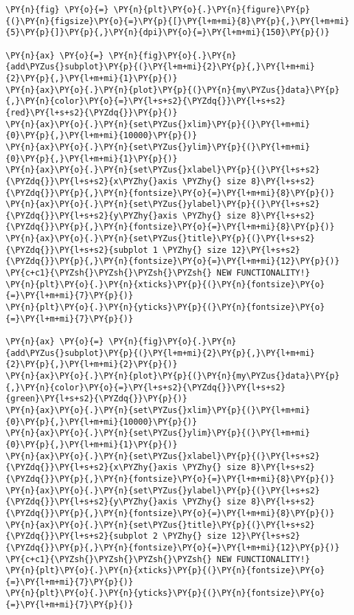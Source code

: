     \begin{tcolorbox}[breakable, size=fbox, boxrule=1pt, pad at break*=1mm,colback=cellbackground, colframe=cellborder]
\begin{Verbatim}[commandchars=\\\{\}]
\PY{n}{fig} \PY{o}{=} \PY{n}{plt}\PY{o}{.}\PY{n}{figure}\PY{p}{(}\PY{n}{figsize}\PY{o}{=}\PY{p}{[}\PY{l+m+mi}{8}\PY{p}{,}\PY{l+m+mi}{5}\PY{p}{]}\PY{p}{,}\PY{n}{dpi}\PY{o}{=}\PY{l+m+mi}{150}\PY{p}{)} 

\PY{n}{ax} \PY{o}{=} \PY{n}{fig}\PY{o}{.}\PY{n}{add\PYZus{}subplot}\PY{p}{(}\PY{l+m+mi}{2}\PY{p}{,}\PY{l+m+mi}{2}\PY{p}{,}\PY{l+m+mi}{1}\PY{p}{)}
\PY{n}{ax}\PY{o}{.}\PY{n}{plot}\PY{p}{(}\PY{n}{my\PYZus{}data}\PY{p}{,}\PY{n}{color}\PY{o}{=}\PY{l+s+s2}{\PYZdq{}}\PY{l+s+s2}{red}\PY{l+s+s2}{\PYZdq{}}\PY{p}{)}
\PY{n}{ax}\PY{o}{.}\PY{n}{set\PYZus{}xlim}\PY{p}{(}\PY{l+m+mi}{0}\PY{p}{,}\PY{l+m+mi}{10000}\PY{p}{)}
\PY{n}{ax}\PY{o}{.}\PY{n}{set\PYZus{}ylim}\PY{p}{(}\PY{l+m+mi}{0}\PY{p}{,}\PY{l+m+mi}{1}\PY{p}{)}
\PY{n}{ax}\PY{o}{.}\PY{n}{set\PYZus{}xlabel}\PY{p}{(}\PY{l+s+s2}{\PYZdq{}}\PY{l+s+s2}{x\PYZhy{}axis \PYZhy{} size 8}\PY{l+s+s2}{\PYZdq{}}\PY{p}{,}\PY{n}{fontsize}\PY{o}{=}\PY{l+m+mi}{8}\PY{p}{)}
\PY{n}{ax}\PY{o}{.}\PY{n}{set\PYZus{}ylabel}\PY{p}{(}\PY{l+s+s2}{\PYZdq{}}\PY{l+s+s2}{y\PYZhy{}axis \PYZhy{} size 8}\PY{l+s+s2}{\PYZdq{}}\PY{p}{,}\PY{n}{fontsize}\PY{o}{=}\PY{l+m+mi}{8}\PY{p}{)}
\PY{n}{ax}\PY{o}{.}\PY{n}{set\PYZus{}title}\PY{p}{(}\PY{l+s+s2}{\PYZdq{}}\PY{l+s+s2}{subplot 1 \PYZhy{} size 12}\PY{l+s+s2}{\PYZdq{}}\PY{p}{,}\PY{n}{fontsize}\PY{o}{=}\PY{l+m+mi}{12}\PY{p}{)}
\PY{c+c1}{\PYZsh{}\PYZsh{}\PYZsh{}\PYZsh{} NEW FUNCTIONALITY!}
\PY{n}{plt}\PY{o}{.}\PY{n}{xticks}\PY{p}{(}\PY{n}{fontsize}\PY{o}{=}\PY{l+m+mi}{7}\PY{p}{)}
\PY{n}{plt}\PY{o}{.}\PY{n}{yticks}\PY{p}{(}\PY{n}{fontsize}\PY{o}{=}\PY{l+m+mi}{7}\PY{p}{)}

\PY{n}{ax} \PY{o}{=} \PY{n}{fig}\PY{o}{.}\PY{n}{add\PYZus{}subplot}\PY{p}{(}\PY{l+m+mi}{2}\PY{p}{,}\PY{l+m+mi}{2}\PY{p}{,}\PY{l+m+mi}{2}\PY{p}{)}
\PY{n}{ax}\PY{o}{.}\PY{n}{plot}\PY{p}{(}\PY{n}{my\PYZus{}data}\PY{p}{,}\PY{n}{color}\PY{o}{=}\PY{l+s+s2}{\PYZdq{}}\PY{l+s+s2}{green}\PY{l+s+s2}{\PYZdq{}}\PY{p}{)}
\PY{n}{ax}\PY{o}{.}\PY{n}{set\PYZus{}xlim}\PY{p}{(}\PY{l+m+mi}{0}\PY{p}{,}\PY{l+m+mi}{10000}\PY{p}{)}
\PY{n}{ax}\PY{o}{.}\PY{n}{set\PYZus{}ylim}\PY{p}{(}\PY{l+m+mi}{0}\PY{p}{,}\PY{l+m+mi}{1}\PY{p}{)}
\PY{n}{ax}\PY{o}{.}\PY{n}{set\PYZus{}xlabel}\PY{p}{(}\PY{l+s+s2}{\PYZdq{}}\PY{l+s+s2}{x\PYZhy{}axis \PYZhy{} size 8}\PY{l+s+s2}{\PYZdq{}}\PY{p}{,}\PY{n}{fontsize}\PY{o}{=}\PY{l+m+mi}{8}\PY{p}{)}
\PY{n}{ax}\PY{o}{.}\PY{n}{set\PYZus{}ylabel}\PY{p}{(}\PY{l+s+s2}{\PYZdq{}}\PY{l+s+s2}{y\PYZhy{}axis \PYZhy{} size 8}\PY{l+s+s2}{\PYZdq{}}\PY{p}{,}\PY{n}{fontsize}\PY{o}{=}\PY{l+m+mi}{8}\PY{p}{)}
\PY{n}{ax}\PY{o}{.}\PY{n}{set\PYZus{}title}\PY{p}{(}\PY{l+s+s2}{\PYZdq{}}\PY{l+s+s2}{subplot 2 \PYZhy{} size 12}\PY{l+s+s2}{\PYZdq{}}\PY{p}{,}\PY{n}{fontsize}\PY{o}{=}\PY{l+m+mi}{12}\PY{p}{)}
\PY{c+c1}{\PYZsh{}\PYZsh{}\PYZsh{}\PYZsh{} NEW FUNCTIONALITY!}
\PY{n}{plt}\PY{o}{.}\PY{n}{xticks}\PY{p}{(}\PY{n}{fontsize}\PY{o}{=}\PY{l+m+mi}{7}\PY{p}{)}
\PY{n}{plt}\PY{o}{.}\PY{n}{yticks}\PY{p}{(}\PY{n}{fontsize}\PY{o}{=}\PY{l+m+mi}{7}\PY{p}{)}


\end{Verbatim}
\end{tcolorbox}
